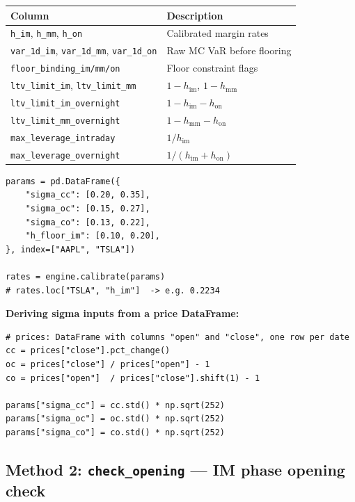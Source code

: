 \documentclass[9pt, a4paper]{extarticle}
\begin{document}
\begin{tabularx}{\linewidth}{lX}
\toprule
\textbf{Column} & \textbf{Description} \\
\midrule
\texttt{h\_im}, \texttt{h\_mm}, \texttt{h\_on}           & Calibrated margin rates \\
\texttt{var\_1d\_im}, \texttt{var\_1d\_mm}, \texttt{var\_1d\_on} & Raw MC VaR before flooring \\
\texttt{floor\_binding\_im/mm/on}                          & Floor constraint flags \\
\texttt{ltv\_limit\_im}, \texttt{ltv\_limit\_mm}          & $1 - h_{\mathrm{im}}$, $1 - h_{\mathrm{mm}}$ \\
\texttt{ltv\_limit\_im\_overnight}                         & $1 - h_{\mathrm{im}} - h_{\mathrm{on}}$ \\
\texttt{ltv\_limit\_mm\_overnight}                         & $1 - h_{\mathrm{mm}} - h_{\mathrm{on}}$ \\
\texttt{max\_leverage\_intraday}                           & $1 / h_{\mathrm{im}}$ \\
\texttt{max\_leverage\_overnight}                          & $1 / (h_{\mathrm{im}} + h_{\mathrm{on}})$ \\
\bottomrule
\end{tabularx}

\begin{lstlisting}
params = pd.DataFrame({
    "sigma_cc": [0.20, 0.35],
    "sigma_oc": [0.15, 0.27],
    "sigma_co": [0.13, 0.22],
    "h_floor_im": [0.10, 0.20],
}, index=["AAPL", "TSLA"])

rates = engine.calibrate(params)
# rates.loc["TSLA", "h_im"]  -> e.g. 0.2234
\end{lstlisting}

\textbf{Deriving sigma inputs from a price DataFrame:}

\begin{lstlisting}
# prices: DataFrame with columns "open" and "close", one row per date
cc = prices["close"].pct_change()
oc = prices["close"] / prices["open"] - 1
co = prices["open"]  / prices["close"].shift(1) - 1

params["sigma_cc"] = cc.std() * np.sqrt(252)
params["sigma_oc"] = oc.std() * np.sqrt(252)
params["sigma_co"] = co.std() * np.sqrt(252)
\end{lstlisting}

\subsection{Method 2: \texttt{check\_opening} — IM phase opening check}
\end{document}
